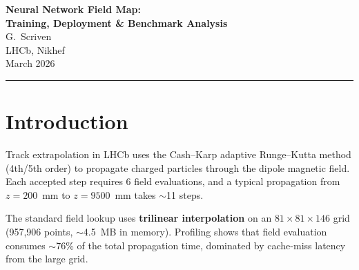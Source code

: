 \documentclass[11pt,a4paper]{article}
\begin{document}
\begin{center}
  {\LARGE\bfseries Neural Network Field Map:\\[4pt]
   Training, Deployment \& Benchmark Analysis}\\[12pt]
  {\large G.~Scriven}\\[4pt]
  {\normalsize LHCb, Nikhef}\\[4pt]
  {\normalsize March 2026}
\end{center}
\vspace{6pt}
\hrule
\vspace{12pt}

\begin{abstract}
This report documents the development and integration of a neural network
surrogate for the LHCb magnetic field map into the \texttt{TrackRungeKuttaExtrapolator}.
A grid search over 30 architectures (ReLU/SiLU $\times$ 1--3 layers $\times$
32--512 neurons) identified optimal accuracy--speed trade-offs. The deployed
model --- a single-layer ReLU network with 32 neurons (227 parameters,
416~FLOPs, 0.89~KB) --- replaces trilinear interpolation of a 4.5~MB field grid.
Three C++ inference paths were implemented: portable scalar, AVX2 SIMD, and
batched AVX2. RDTSC sub-operation profiling quantifies the field evaluation
fraction within the full Runge--Kutta pipeline and establishes the Amdahl's Law
ceiling for achievable speedup.
\end{abstract}

\tableofcontents
\newpage

\section{Introduction}
\label{sec:intro}

Track extrapolation in LHCb uses the Cash--Karp adaptive Runge--Kutta method
(4th/5th order) to propagate charged particles through the dipole magnetic
field. Each accepted step requires 6 field evaluations, and a typical
propagation from $z = 200$~mm to $z = 9500$~mm takes $\sim$11 steps.

The standard field lookup uses \textbf{trilinear interpolation} on an
$81 \times 81 \times 146$ grid (957,906 points, $\sim$4.5~MB in memory).
Profiling shows that field evaluation consumes $\sim$76\% of the total
propagation time, dominated by cache-miss latency from the large grid.
\end{document}
